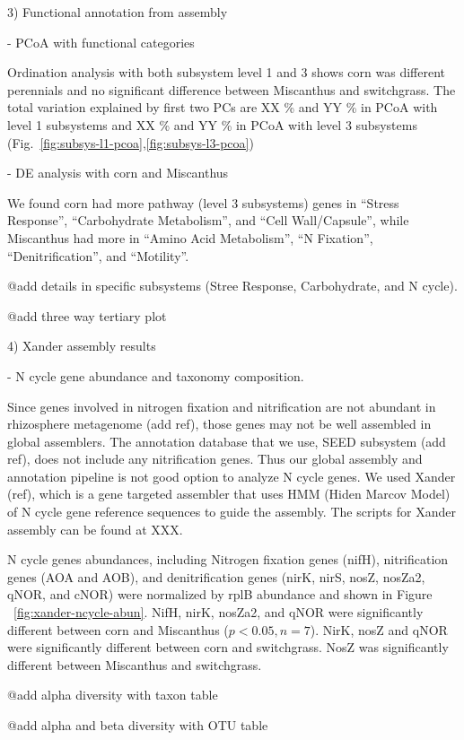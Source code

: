 \documentclass[12pt]{article}
\begin{document}
3) Functional annotation from assembly

- PCoA with functional categories

Ordination analysis with both subsystem level 1 and 3 shows corn was different perennials and no significant difference between Miscanthus and switchgrass. The total variation explained by first two PCs are XX \% and YY \% in PCoA with level 1 subsystems and XX \% and YY \% in PCoA with level 3 subsystems (Fig.~\ref{fig:subsys-l1-pcoa},\ref{fig:subsys-l3-pcoa})

- DE analysis with corn and Miscanthus

We found corn had more pathway (level 3 subsystems) genes in ``Stress Response'', ``Carbohydrate Metabolism'', and ``Cell Wall/Capsule'', while Miscanthus had more in ``Amino Acid Metabolism'', ``N Fixation'', ``Denitrification'', and ``Motility''.

  @add details in specific subsystems (Stree Response, Carbohydrate, and N cycle).

  @add three way tertiary plot

4) Xander assembly results

- N cycle gene abundance and taxonomy composition.

Since genes involved in nitrogen fixation and nitrification are not abundant in rhizosphere metagenome (add ref), those genes may not be well assembled in global assemblers. The annotation database that we use, SEED subsystem (add ref), does not include any nitrification genes. Thus our global assembly and annotation pipeline is not good option to analyze N cycle genes. We used Xander (ref), which is a gene targeted assembler that uses HMM (Hiden Marcov Model) of N cycle gene reference sequences to guide the assembly. The scripts for Xander assembly can be found at XXX.

N cycle genes abundances, including Nitrogen fixation genes (nifH), nitrification genes (AOA and AOB), and denitrification genes (nirK, nirS, nosZ, nosZa2, qNOR, and cNOR) were normalized by rplB abundance and shown in Figure ~\ref{fig:xander-ncycle-abun}. NifH, nirK, nosZa2, and qNOR were significantly different between corn and Miscanthus ($p < 0.05, n = 7$). NirK, nosZ and qNOR  were significantly different between corn and switchgrass. NosZ was significantly different between Miscanthus and switchgrass.

@add alpha diversity with taxon table

@add alpha and beta diversity with OTU table
\end{document}
